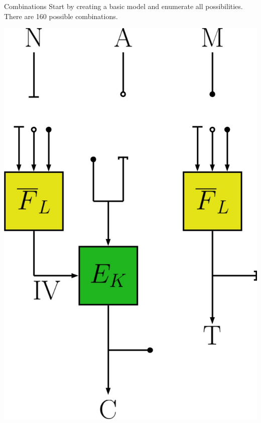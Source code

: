\documentclass[11pt]{beamer}
\begin{document}
\begin{frame}{Combinations}
Start by creating a basic model and enumerate all possibilities.
There are 160 possible combinations.
\begin{center}
\includegraphics[scale=0.12]{plugs.jpg}
\end{center}
\end{frame}
\end{document}
